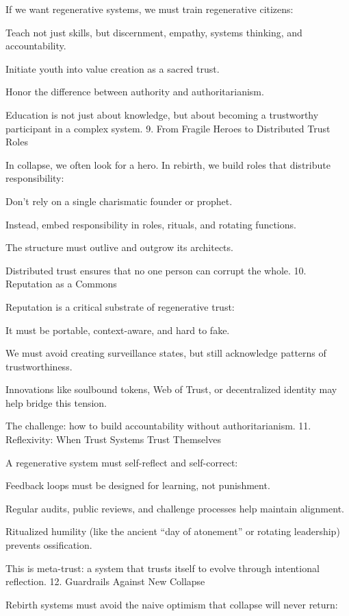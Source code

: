 \documentclass[11pt,oneside]{book}
\begin{document}
If we want regenerative systems, we must train regenerative citizens:

    Teach not just skills, but discernment, empathy, systems thinking, and accountability.

    Initiate youth into value creation as a sacred trust.

    Honor the difference between authority and authoritarianism.

Education is not just about knowledge, but about becoming a trustworthy participant in a complex system.
9. From Fragile Heroes to Distributed Trust Roles

In collapse, we often look for a hero. In rebirth, we build roles that distribute responsibility:

    Don't rely on a single charismatic founder or prophet.

    Instead, embed responsibility in roles, rituals, and rotating functions.

    The structure must outlive and outgrow its architects.

Distributed trust ensures that no one person can corrupt the whole.
10. Reputation as a Commons

Reputation is a critical substrate of regenerative trust:

    It must be portable, context-aware, and hard to fake.

    We must avoid creating surveillance states, but still acknowledge patterns of trustworthiness.

    Innovations like soulbound tokens, Web of Trust, or decentralized identity may help bridge this tension.

The challenge: how to build accountability without authoritarianism.
11. Reflexivity: When Trust Systems Trust Themselves

A regenerative system must self-reflect and self-correct:

    Feedback loops must be designed for learning, not punishment.

    Regular audits, public reviews, and challenge processes help maintain alignment.

    Ritualized humility (like the ancient “day of atonement” or rotating leadership) prevents ossification.

This is meta-trust: a system that trusts itself to evolve through intentional reflection.
12. Guardrails Against New Collapse

Rebirth systems must avoid the naive optimism that collapse will never return:
\end{document}
